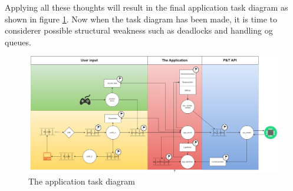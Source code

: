 Applying all these thoughts will result in the final application task diagram as shown in figure \ref{fig:applicaiton_task_diagram}. Now when the task diagram has been made, it is time to considerer possible structural weakness such as deadlocks and handling og queues. 

\begin{figure}
	\centering
	\includegraphics[scale= 0.4, angle = 90] {Billeder/microcontroller-Task-Diagram}
	\caption{The application task diagram}
	\label{fig:applicaiton_task_diagram}
\end{figure}